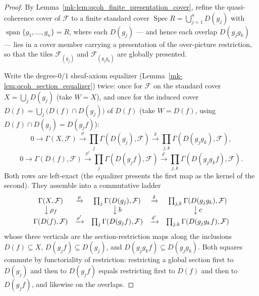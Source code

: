 \begin{proof}
  \leanok
    By Lemma~\ref{mk-lem:qcoh_finite_presentation_cover}, refine the quasi-coherence cover of
  \(\mathcal{F}\) to a finite standard cover \(\operatorname{Spec} R = \bigcup_{j=1}^{n} D(g_j)\) with
  \(\operatorname{span}\{g_1, \ldots, g_n\} = R\), where each \(D(g_j)\) — and hence each overlap
  \(D(g_j g_k)\) — lies in a cover member carrying a presentation of the over-picture restriction, so
  that the tiles \(\mathcal{F}_{(g_j)}\) and \(\mathcal{F}_{(g_j g_k)}\) are globally presented.

  Write the degree-\(0/1\) sheaf-axiom equalizer (Lemma~\ref{mk-lem:qcoh_section_equalizer}) twice: once for
  \(\mathcal{F}\) on the standard cover \(X = \bigcup_j D(g_j)\) (take \(W = X\)), and once for the induced
  cover \(D(f) = \bigcup_j \bigl(D(f) \cap D(g_j)\bigr)\) of \(D(f)\) (take \(W = D(f)\), using
  \(D(f) \cap D(g_j) = D(g_j f)\)):
  \[
    0 \to \Gamma(X, \mathcal{F}) \xrightarrow{\rho} \prod_j \Gamma(D(g_j), \mathcal{F})
      \xrightarrow{\delta} \prod_{j,k} \Gamma(D(g_j g_k), \mathcal{F}),
  \]
  \[
    0 \to \Gamma(D(f), \mathcal{F}) \xrightarrow{\rho'} \prod_j \Gamma(D(g_j f), \mathcal{F})
      \xrightarrow{\delta'} \prod_{j,k} \Gamma(D(g_j g_k f), \mathcal{F}).
  \]
  Both rows are left-exact (the equalizer presents the first map as the kernel of the second). They
  assemble into a commutative ladder
  \[
    \begin{array}{ccccc}
      \Gamma(X, \mathcal{F}) & \xrightarrow{\rho} & \prod_j \Gamma(D(g_j), \mathcal{F})
        & \xrightarrow{\delta} & \prod_{j,k} \Gamma(D(g_j g_k), \mathcal{F}) \\
      \big\downarrow{\,\rho_f} & & \big\downarrow{\,b} & & \big\downarrow{\,c} \\
      \Gamma(D(f), \mathcal{F}) & \xrightarrow{\rho'} & \prod_j \Gamma(D(g_j f), \mathcal{F})
        & \xrightarrow{\delta'} & \prod_{j,k} \Gamma(D(g_j g_k f), \mathcal{F})
    \end{array}
  \]
  whose three verticals are the section-restriction maps along the inclusions \(D(f) \subseteq X\),
  \(D(g_j f) \subseteq D(g_j)\), and \(D(g_j g_k f) \subseteq D(g_j g_k)\). Both squares commute by
  functoriality of restriction: restricting a global section first to \(D(g_j)\) and then to
  \(D(g_j f)\) equals restricting first to \(D(f)\) and then to \(D(g_j f)\), and likewise on the
  overlaps.


\end{proof}
